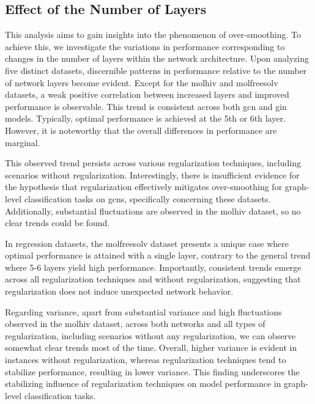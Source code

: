 \subsection{Effect of the Number of Layers}
This analysis aims to gain insights into the phenomenon of over-smoothing. To achieve this, we investigate the variations in performance corresponding to changes in the number of layers within the network architecture.
Upon analyzing five distinct datasets, discernible patterns in performance relative to the number of network layers become evident. Except for the molhiv and molfreesolv datasets, a weak positive correlation between increased layers and improved performance is observable. This trend is consistent across both \ac{gcn} and \ac{gin} models. Typically, optimal performance is achieved at the 5th or 6th layer. However, it is noteworthy that the overall differences in performance are marginal.

This observed trend persists across various regularization techniques, including scenarios without regularization.
Interestingly, there is insufficient evidence for the hypothesis that regularization effectively mitigates over-smoothing for graph-level classification tasks on \acp{gcn}, specifically concerning these datasets.
Additionally, substantial fluctuations are observed in the molhiv dataset, so no clear trends could be found.

In regression datasets, the molfreesolv dataset presents a unique case where optimal performance is attained with a single layer, contrary to the general trend where 5-6 layers yield high performance. Importantly, consistent trends emerge across all regularization techniques and without regularization, suggesting that regularization does not induce unexpected network behavior.

Regarding variance, apart from substantial variance and high fluctuations observed in the molhiv dataset, across both networks and all types of regularization, including scenarios without any regularization, we can observe somewhat clear trends most of the time.
Overall, higher variance is evident in instances without regularization, whereas regularization techniques tend to stabilize performance, resulting in lower variance. This finding underscores the stabilizing influence of regularization techniques on model performance in graph-level classification tasks.


